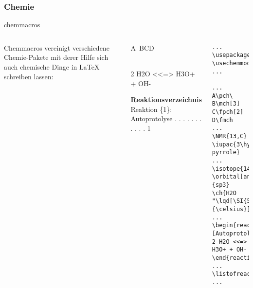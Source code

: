 \subsubsection{Chemie}
\begin{frame}[fragile]{chemmacros}

\begin{columns}[c]

    Chemmacros vereinigt verschiedene Chemie-Pakete mit derer Hilfe sich auch chemische Dinge in {\LaTeX} schreiben lassen:

    \begin{outputbox}
\begin{centering}
\vspace{8px}
A\pch\ B\mch[3] C\fpch[2] D\fmch \\
\vspace{8px}
 \hspace{12px}\\ 
\vspace{1px}
  
\vspace{2px}
 \begin{reaction}[Autoprotolyse] 
 2 H2O <<=> H3O+ + OH-
 \end{reaction}
\vspace{1px}
\begin{flushleft}
{\large\textbf{Reaktionsverzeichnis}}\\
\vspace{8px}
Reaktion \{1\}: Autoprotolyse . . . . . . . . . . .   1
\end{flushleft}
\end{centering}
\end{outputbox}



\begin{lstlisting}[]
...
\usepackage{chemmacros}
\usechemmodule{all} 
...

...
A\pch\ B\mch[3] C\fpch[2] D\fmch
...
\NMR{13,C} 
\iupac{3\hydrogen-pyrrole}
...
\isotope{14,C} 
\orbital[angle=35]{sp3}
\ch{H2O "\lqd[\SI{5}{\celsius}]"}
...
\begin{reaction}[Autoprotolyse] 
2 H2O <<=> H3O+ + OH-
\end{reaction}
...
\listofreactions
...

\end{lstlisting}

    
  \end{columns}


\end{frame}



 
